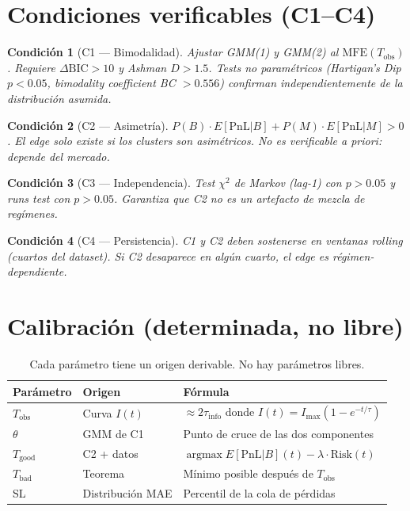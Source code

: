 \documentclass[11pt,a4paper]{article}
\newtheorem{condition}{Condición}
\begin{document}
\section{Condiciones verificables (C1--C4)}
 
\begin{condition}[C1 --- Bimodalidad]
Ajustar GMM(1) y GMM(2) al $\text{MFE}(T_{\text{obs}})$. Requiere $\Delta\text{BIC} > 10$ y Ashman $D > 1.5$. Tests no paramétricos (Hartigan's Dip $p < 0.05$, bimodality coefficient BC $> 0.556$) confirman independientemente de la distribución asumida.
\end{condition}
 
\begin{condition}[C2 --- Asimetría]
$P(B)\cdot E[\text{PnL}|B] + P(M)\cdot E[\text{PnL}|M] > 0$. El edge solo existe si los clusters son asimétricos. No es verificable a priori: depende del mercado.
\end{condition}
 
\begin{condition}[C3 --- Independencia]
Test $\chi^2$ de Markov (lag-1) con $p > 0.05$ y runs test con $p > 0.05$. Garantiza que C2 no es un artefacto de mezcla de regímenes.
\end{condition}
 
\begin{condition}[C4 --- Persistencia]
C1 y C2 deben sostenerse en ventanas rolling (cuartos del dataset). Si C2 desaparece en algún cuarto, el edge es régimen-dependiente.
\end{condition}
 
\section{Calibración (determinada, no libre)}
 
\begin{table}[H]
\centering
\begin{tabular}{lll}
\toprule
\textbf{Parámetro} & \textbf{Origen} & \textbf{Fórmula} \\
\midrule
$T_{\text{obs}}$ & Curva $I(t)$ & $\approx 2\tau_{\text{info}}$ donde $I(t) = I_{\max}(1 - e^{-t/\tau})$ \\
$\theta$ & GMM de C1 & Punto de cruce de las dos componentes \\
$T_{\text{good}}$ & C2 + datos & $\operatorname{argmax} E[\text{PnL}|B](t) - \lambda \cdot \text{Risk}(t)$ \\
$T_{\text{bad}}$ & Teorema & Mínimo posible después de $T_{\text{obs}}$ \\
SL & Distribución MAE & Percentil de la cola de pérdidas \\
\bottomrule
\end{tabular}
\caption{Cada parámetro tiene un origen derivable. No hay parámetros libres.}
\end{table}
 
\end{document}
